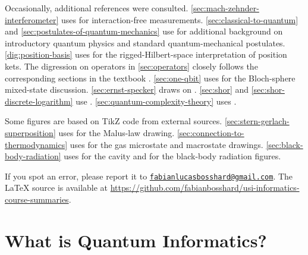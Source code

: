 Occasionally, additional references were consulted.
\autoref{sec:mach-zehnder-interferometer} 
uses \cite{elitzurVaidmanInteractionFree} 
for interaction-free measurements.
\autoref{sec:classical-to-quantum} and \autoref{sec:postulates-of-quantum-mechanics} 
use
\cite{delRioLaneveCarocariQuantumPhysics,zettiliQuantumMechanics} 
for additional background on introductory quantum physics and standard quantum-mechanical postulates.  
\autoref{dig:position-basis} uses \cite{deLaMadridRiggedHilbertSpace} for the rigged-Hilbert-space interpretation of position kets.
The digression on operators in 
\autoref{sec:operators} 
closely follows the corresponding sections in the textbook
\cite{rudinFunctionalAnalysis}. 
\autoref{sec:one-qbit} uses \cite{wikipediaBlochSphere} for the Bloch-sphere mixed-state discussion.
\autoref{sec:ernst-specker} 
draws on 
\cite{speckerLogikNichtGleichzeitigEntscheidbarerAussagen,kochenSpeckerHiddenVariables,rennerWolfPseudoTelepathy,rennerWolfSpeckerHiddenVariables}.
\autoref{sec:shor} and \autoref{sec:shor-discrete-logarithm} 
use
\cite{wikipediaQFTGateCount,laneveQuantumAlgorithms,shorAlgorithms,shoupGenericDLP,hhanYamakawaYunDiscreteLog,wikipediaTotientGrowth}.
\autoref{sec:quantum-complexity-theory} 
uses
\cite{nielsenChuangQCQI,gharibianQuantumComplexityTheory}.

Some figures are based on TikZ code from external sources.
\autoref{sec:stern-gerlach-superposition} uses \cite{tikzNetMalusLaw} for the Malus-law drawing.
\autoref{sec:connection-to-thermodynamics} uses \cite{tikzNetGas} for the gas microstate and macrostate drawings.
\autoref{sec:black-body-radiation} uses \cite{texSECuboid} for the cavity and \cite{tikzNetBlackbodyColor} for the black-body radiation figures.


If you spot an error, please report it to
\href{mailto:fabianlucasbosshard@gmail.com}{\nolinkurl{fabianlucasbosshard@gmail.com}}.
The \LaTeX{} source is available at
\url{https://github.com/fabianbosshard/usi-informatics-course-summaries}.

\doclicenseThis


\clearpage

\let\emphoriginal\emph           %
\renewcommand{\emph}[1]{\textcolor{black}{#1}}
\printbibliography[heading=bibintoc,title={References}]
\let\emph\emphoriginal           %



\clearpage
{}


\section{What is Quantum Informatics?}\label{sec:what-is-quantum-informatics}


